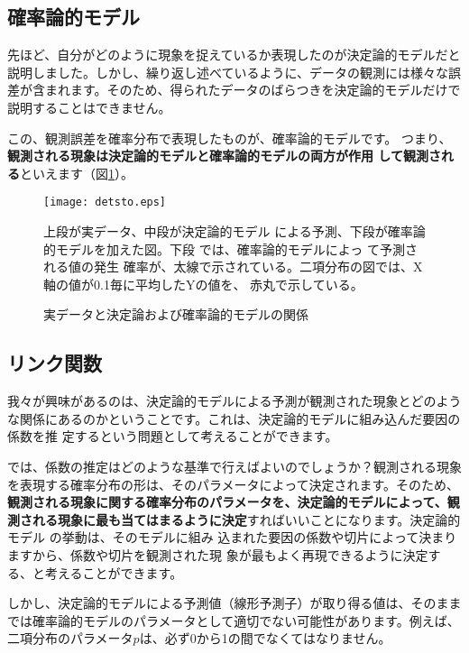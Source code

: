 	\subsection{確率論的モデル}
先ほど、自分がどのように現象を捉えているか表現したのが決定論的モデルだと説明しました。しかし、繰り返し述べているように、データの観測には様々な誤差が含まれます。そのため、得られたデータのばらつきを決定論的モデルだけで説明することはできません。

この、観測誤差を確率分布で表現したものが、確率論的モデルです。
つまり、\textbf{観測される現象は決定論的モデルと確率論的モデルの両方が作用
して観測される}といえます（図\ref{detsto}）。
\begin{figure}[htb]
\begin{center}
\graphicspath{{3_glm/figs/}}
\texttt{[image: detsto.eps]}\\
\caption{実データと決定論および確率論的モデルの関係}
 \label{detsto}
 \begin{flushleft}
\scriptsize 上段が実データ、中段が決定論的モデル
  による予測、下段が確率論
  的モデルを加えた図。下段
  では、確率論的モデルによっ
  て予測される値の発生  確率が、太線で示されている。二項分布の図では、X軸の値が0.1毎に平均したYの値を、
  赤丸で示している。
\end{flushleft}
\end{center}
\end{figure}%

	\subsection{リンク関数}
我々が興味があるのは、決定論的モデルによる予測が観測された現象とどのような関係にあるのかということです。これは、決定論的モデルに組み込んだ要因の係数を推
定するという問題として考えることができます。

では、係数の推定はどのような基準で行えばよいのでしょうか？観測される現象
を表現する確率分布の形は、そのパラメータによって決定されます。そのため、
\textbf{観測される現象に関する確率分布のパラメータを、決定論的モデルによって、観測される現象に最も当てはまるように決定}すればいいことになります。決定論的モデル
の挙動は、そのモデルに組み
込まれた要因の係数や切片によって決まりますから、係数や切片を観測された現
象が最もよく再現できるように決定する、と考えることができます。

しかし、決定論的モデルによる予測値（線形予測子）が取り得る値は、そのままでは確率論的モデルのパラメータとして適切でない可能性があります。例えば、二項分布のパラメータ$p$は、必ず0から1の間でなくてはなりません。

